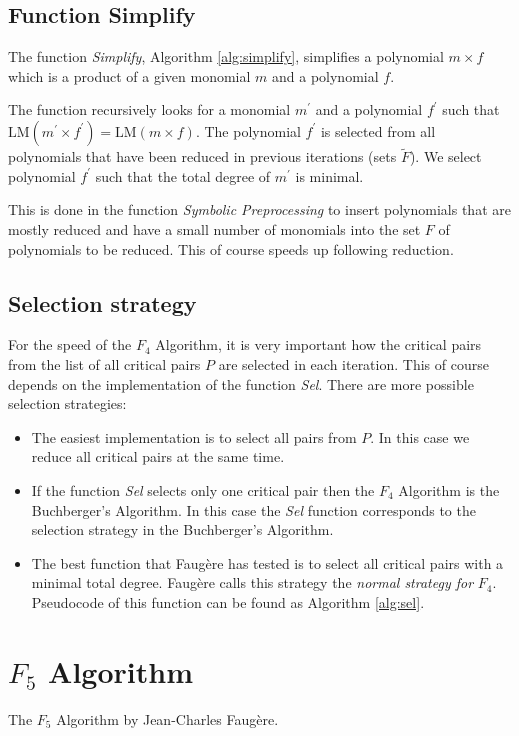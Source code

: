 

\subsection{Function Simplify}
The function \textit{Simplify}, Algorithm \ref{alg:simplify}, simplifies a polynomial $m \times f$ which is a product of a given monomial $m$ and a polynomial $f$.

The function recursively looks for a monomial $m^\prime$ and a polynomial $f^\prime$ such that $\textrm{LM}(m^\prime\times f^\prime) = \textrm{LM}(m\times f)$. The polynomial $f^\prime$ is selected from all polynomials that have been reduced in previous iterations (sets $\tilde{F}$). We select polynomial $f^\prime$ such that the total degree of $m^\prime$ is minimal.

This is done in the function \textit{Symbolic Preprocessing} to insert polynomials that are mostly reduced and have a small number of monomials into the set $F$ of polynomials to be reduced. This of course speeds up following reduction.



\subsection{Selection strategy}
\label{subsec:F4:sel}
For the speed of the $F_4$ Algorithm, it is very important how the critical pairs from the list of all critical pairs $P$ are selected in each iteration. This of course depends on the implementation of the function \textit{Sel}. There are more possible selection strategies:

\begin{itemize}
  \item The easiest implementation is to select all pairs from $P$. In this case we reduce all critical pairs at the same time.
  \item If the function \textit{Sel} selects only one critical pair then the $F_4$ Algorithm is the Buchberger's Algorithm. In this case the \textit{Sel} function corresponds to the selection strategy in the Buchberger's Algorithm.
  \item The best function that Faug\`ere has tested is to select all critical pairs with a minimal total degree. Faug\`ere calls this strategy the \textit{normal strategy for} $F_4$. Pseudocode of this function can be found as Algorithm \ref{alg:sel}.
\end{itemize}



\section{$F_5$ Algorithm}
The $F_5$ Algorithm \cite{F5} by Jean-Charles Faug\`ere.
